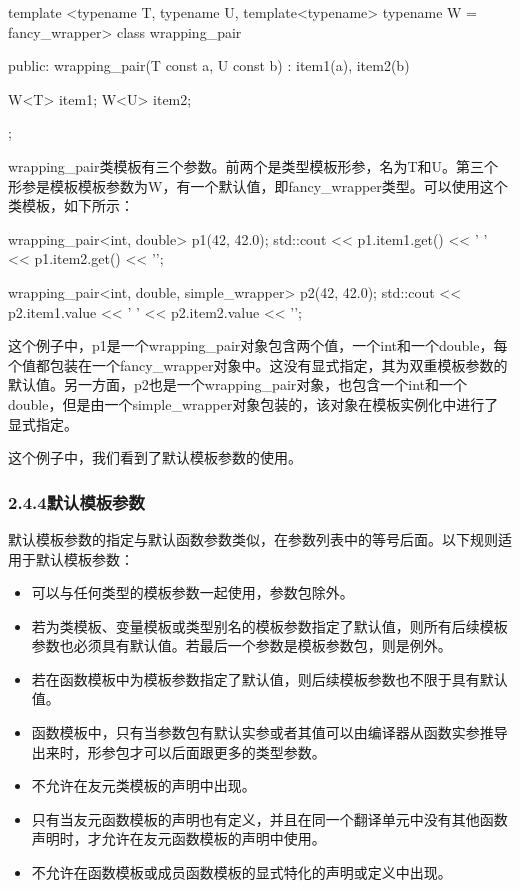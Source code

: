 \begin{cpp}
template <typename T, typename U,
		  template<typename> typename W = fancy_wrapper>
class wrapping_pair
{
public:
	wrapping_pair(T const a, U const b) :
		item1(a), item2(b)
	{
	}

	W<T> item1;
	W<U> item2;
};
\end{cpp}

wrapping\_pair类模板有三个参数。前两个是类型模板形参，名为T和U。第三个形参是模板模板参数为W，有一个默认值，即fancy\_wrapper类型。可以使用这个类模板，如下所示：

\begin{cpp}
wrapping_pair<int, double> p1(42, 42.0);
std::cout << p1.item1.get() << ' '
		  << p1.item2.get() << '\n';

wrapping_pair<int, double, simple_wrapper> p2(42, 42.0);
std::cout << p2.item1.value << ' '
		  << p2.item2.value << '\n';
\end{cpp}

这个例子中，p1是一个wrapping\_pair对象包含两个值，一个int和一个double，每个值都包装在一个fancy\_wrapper对象中。这没有显式指定，其为双重模板参数的默认值。另一方面，p2也是一个wrapping\_pair对象，也包含一个int和一个double，但是由一个simple\_wrapper对象包装的，该对象在模板实例化中进行了显式指定。

这个例子中，我们看到了默认模板参数的使用。

\subsubsection{2.4.4\hspace{0.2cm}默认模板参数}

默认模板参数的指定与默认函数参数类似，在参数列表中的等号后面。以下规则适用于默认模板参数：

\begin{itemize}
\item 
可以与任何类型的模板参数一起使用，参数包除外。

\item 
若为类模板、变量模板或类型别名的模板参数指定了默认值，则所有后续模板参数也必须具有默认值。若最后一个参数是模板参数包，则是例外。

\item 
若在函数模板中为模板参数指定了默认值，则后续模板参数也不限于具有默认值。

\item 
函数模板中，只有当参数包有默认实参或者其值可以由编译器从函数实参推导出来时，形参包才可以后面跟更多的类型参数。

\item 
不允许在友元类模板的声明中出现。

\item 
只有当友元函数模板的声明也有定义，并且在同一个翻译单元中没有其他函数声明时，才允许在友元函数模板的声明中使用。

\item 
不允许在函数模板或成员函数模板的显式特化的声明或定义中出现。
\end{itemize}


